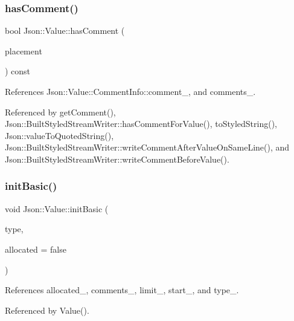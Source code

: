 \subsubsection{\texorpdfstring{has\+Comment()}{hasComment()}}
{\footnotesize\ttfamily bool Json\+::\+Value\+::has\+Comment (\begin{DoxyParamCaption}\item[{\hyperlink{namespaceJson_a4fc417c23905b2ae9e2c47d197a45351_a4fc417c23905b2ae9e2c47d197a45351}{Comment\+Placement}}]{placement }\end{DoxyParamCaption}) const}



References Json\+::\+Value\+::\+Comment\+Info\+::comment\+\_\+, and comments\+\_\+.



Referenced by get\+Comment(), Json\+::\+Built\+Styled\+Stream\+Writer\+::has\+Comment\+For\+Value(), to\+Styled\+String(), Json\+::value\+To\+Quoted\+String(), Json\+::\+Built\+Styled\+Stream\+Writer\+::write\+Comment\+After\+Value\+On\+Same\+Line(), and Json\+::\+Built\+Styled\+Stream\+Writer\+::write\+Comment\+Before\+Value().

\mbox{\label{classJson_1_1Value_a32b86b71564157f40f880f5736be822a_a32b86b71564157f40f880f5736be822a}} 
\subsubsection{\texorpdfstring{init\+Basic()}{initBasic()}}
{\footnotesize\ttfamily void Json\+::\+Value\+::init\+Basic (\begin{DoxyParamCaption}\item[{\hyperlink{namespaceJson_a7d654b75c16a57007925868e38212b4e_a7d654b75c16a57007925868e38212b4e}{Value\+Type}}]{type,  }\item[{bool}]{allocated = {\ttfamily false} }\end{DoxyParamCaption})\hspace{0.3cm}{\ttfamily [private]}}



References allocated\+\_\+, comments\+\_\+, limit\+\_\+, start\+\_\+, and type\+\_\+.



Referenced by Value().

